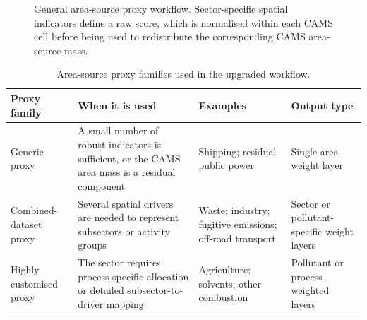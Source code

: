 \begin{figure}[htbp]
  \centering
  \caption{General area-source proxy workflow. Sector-specific spatial indicators define a raw score, which is normalised within each CAMS cell before being used to redistribute the corresponding CAMS area-source mass.}
  \label{fig:area-source-workflow}
\end{figure}

\begin{table}[htbp]
  \centering
  \caption{Area-source proxy families used in the upgraded workflow.}
  \label{tab:area-source-families}
  \begin{tabular}{p{} p{} p{} p{}}
    \toprule
    Proxy family & When it is used & Examples & Output type \\
    \midrule
    Generic proxy & A small number of robust indicators is sufficient, or the CAMS area mass is a residual component & Shipping; residual public power & Single area-weight layer \\
    Combined-dataset proxy & Several spatial drivers are needed to represent subsectors or activity groups & Waste; industry; fugitive emissions; off-road transport & Sector or pollutant-specific weight layers \\
    Highly customised proxy & The sector requires process-specific allocation or detailed subsector-to-driver mapping & Agriculture; solvents; other combustion & Pollutant or process-weighted layers \\
    \bottomrule
  \end{tabular}
\end{table}

